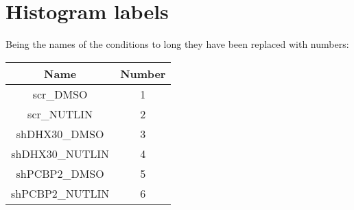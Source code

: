 \documentclass{article}
\begin{document}
\section*{Histogram labels}
Being the names of the conditions to long they have been replaced with numbers:
\begin{table}[H]
	\centering
	\begin{tabular}{|c|c|}
		\hline
		Name & Number \\
		\hline
		scr\_DMSO & 1 \\
		\hline
		scr\_NUTLIN & 2\\
		\hline
		shDHX30\_DMSO & 3 \\
		\hline
		shDHX30\_NUTLIN & 4\\
		\hline
		shPCBP2\_DMSO & 5 \\
		\hline
		shPCBP2\_NUTLIN & 6\\
		\hline
	\end{tabular}
\end{table}
\end{document}
